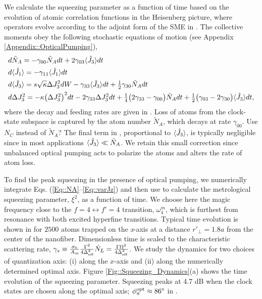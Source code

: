 \documentclass[preprint, aps,pra,onecolumn]{revtex4-1} %
\newcommand{\varz}{\Delta J_3^2}
\newcommand{\qangle}{\phi_\pi}
\newcommand{\magic}[1]{\omega_{#1}^m}
\newcommand{\NA}{\tilde{N}_A}
\newcommand{\comment}[1]{{\color{Maroon} #1}}
\begin{document}
We calculate the squeezing parameter as a function of time based on the evolution of atomic correlation functions  in the Heisenberg picture, where operators evolve according to the adjoint form of the SME in .  The collective moments obey the following stochastic equations of motion (see Appendix \ref{Appendix::OpticalPumping}),
	\begin{align} 
		&d \NA = -\gamma_{00} \NA  dt + 2\gamma_{03} \expt{\hat{J}_3} dt \label{Eq::NA}\\
		&d \expt{\hat{J}_1}  = -\gamma_{11} \expt{\hat{J}_1} dt  \label{Eq::MeanSpinDecay} \\
		&d \expt{\hat{J}_3}  = s\sqrt{\kappa} \varz dW -\gamma_{33} \expt{\hat{J}_3}dt + \smallfrac{1}{2}\gamma_{30} \NA dt   \\
		&d \varz  = - \kappa \big(\varz\big)^2 dt- 2 \gamma_{33} \varz dt + \smallfrac{1}{4} \big( 2\gamma_{33}-\gamma_{00} \big) \NA dt + \smallfrac{1}{2} \big( \gamma_{03} - 2 \gamma_{30} \big) \expt{\hat{J}_3} dt,   \label{Eq::varJz} 
	\end{align}
where the decay and feeding rates are given in .
Loss of atoms from the clock-state subspace is captured by the atom number $ \NA $, which decays at rate $\gamma_{00}$. 
\comment{Use $ N_C$ instead of $\tilde{N}_A $?}
The final term in , proportional to $\langle{\hat{J}_3}\rangle$, is typically negligible since in most applications $\expt{\hat{J}_3} \ll \NA$.  
We retain this small correction since unbalanced optical pumping acts to polarize the atoms and alters the rate of atom loss.  

To find the peak squeezing in the presence of optical pumping, we numerically integrate Eqs. (\ref{Eq::NA}--\ref{Eq::varJz}) and then use  to calculate the metrological squeezing parameter, $\xi^2$, as a function of time. 
We choose here the magic frequency close to the $ f=4\leftrightarrow f'=4 $ transition, $ \magic{4} $, which is furthest from resonance with both excited hyperfine transitions. 
Typical time evolution is shown in  for $2500$ atoms trapped on the \emph{x}-axis at a distance $r'\!_\perp=1.8a$ from the center of the nanofiber. 
Dimensionless time is scaled to the characteristic scattering rate, $\gamma_s \equiv %
\frac{\sigma_0}{A_{\rm in}}\frac{\Gamma^2}{4 \Delta_\eff^2} \dot{N}_L=\frac{\Gamma\Omega^2}{4\Delta_{\rm eff}^2}$. 
We study the dynamics for two choices of quantization axis: (i) along the $x$-axis and (ii) along the numerically determined optimal axis. 
Figure \ref{Fig::Squeezing_Dynamics}(a) shows the time evolution of the squeezing parameter. 
Squeezing peaks at 4.7 dB when the clock states are chosen along the optimal axis; $\qangle^{\rm opt} \approx 86^\circ$ in . 
\end{document}
